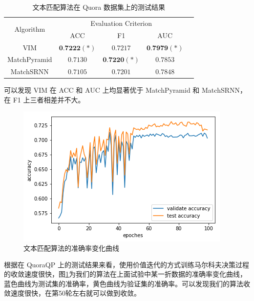 \begin{table}[htbp]
\caption{文本匹配算法在 Quora 数据集上的测试结果}\label{tab:MDP_test}
\vspace{0.5em}\centering\wuhao
\begin{tabular}{ccccc}
\toprule[1.5pt]
	\multirow{2}{*}{Algorithm} &
	\multicolumn{3}{c}{\multirow{1}{*}{Evaluation Criterion}} \\
	\cline{2-4} & ACC & F1 & AUC \\
	\midrule[1pt]
	VIM & $\textbf{0.7222}(*)$ & $0.7217$ & $\textbf{0.7979}(*)$ \\
    MatchPyramid & $0.7130$ & $\textbf{0.7220}(*)$ & $0.7853$ \\
    MatchSRNN & $0.7105$ & $0.7201$ & $0.7848$\\
\bottomrule[1.5pt]
\end{tabular}
\vspace{\baselineskip}
\end{table}

可以发现 VIM 在 ACC 和 AUC 上均显著优于 MatchPyramid 和 MatchSRNN， 在 F1 上三者相差并不大。

\begin{figure}[!htbp]
\vspace{1em}
\centering
  \includegraphics[width=0.8\linewidth]{figures/value_iter_line}
  \caption{文本匹配算法的准确率变化曲线}
  \label{fig:value_iter_line}       %
\vspace{1em}
\end{figure}

根据在 QuoraQP 上的测试结果来看，使用价值迭代的方式训练马尔科夫决策过程的收敛速度很快，图\ref{fig:value_iter_line}为我们的算法在上面试验中某一折数据的准确率变化曲线，蓝色曲线为测试集的准确率，黄色曲线为验证集的准确率。可以发现我们的算法收敛速度很快，在第50轮左右就可以做到收敛。



